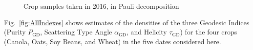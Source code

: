 \documentclass[journal]{IEEEtran}
\begin{document}
	\begin{figure}[hbt]
		\centering
		\caption{Crop samples taken in 2016, in Pauli decomposition}
		\label{fig:sample_images}
	\end{figure}
	
	Fig.~\ref{fig:AllIndexes} shows estimates of the densities of the three Geodesic Indices (Purity $P_{\text{GD}}$, Scattering Type Angle $\alpha_{\text{GD}}$, and Helicity $\tau_{\text{GD}}$) for the four crops (Canola, Oats, Soy Beans, and Wheat) in the five dates considered here.
	
\end{document}
